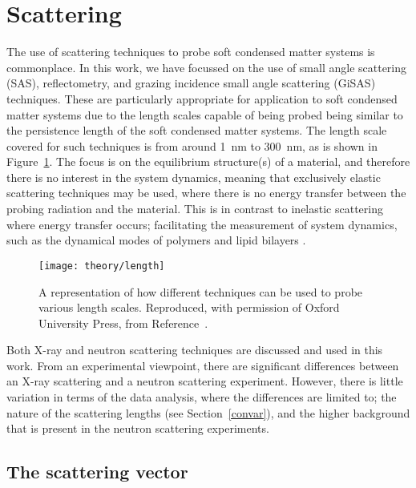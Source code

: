 \section{Scattering}
\label{sec:scattering}

The use of scattering techniques to probe soft condensed matter systems is commonplace.
In this work, we have focussed on the use of small angle scattering (SAS), reflectometry, and grazing incidence small angle scattering (GiSAS) techniques.
These are particularly appropriate for application to soft condensed matter systems due to the length scales capable of being probed being similar to the persistence length of the soft condensed matter systems.
The length scale covered for such techniques is from around \SI{1}{\nano\metre} to \SI{300}{\nano\metre}, as is shown in Figure~\ref{fig:lengths}.
The focus is on the equilibrium structure(s) of a material, and therefore there is no interest in the system dynamics, meaning that exclusively elastic scattering techniques may be used, where there is no energy transfer between the probing radiation and the material.
This is in contrast to inelastic scattering where energy transfer occurs; facilitating the measurement of system dynamics, such as the dynamical modes of polymers and lipid bilayers \cite{garcia_sakai_quasielastic_2009, farago_recent_2009}.
%
\begin{figure}
    \centering
    \texttt{[image: theory/length]}
    \caption{A representation of how different techniques can be used to probe various length scales. Reproduced, with permission of Oxford University Press\textsuperscript{\textcopyright}, from Reference~\cite{sivia_elementary_2011}.}
    \label{fig:lengths}
\end{figure}
%

Both X-ray and neutron scattering techniques are discussed and used in this work.
From an experimental viewpoint, there are significant differences between an X-ray scattering and a neutron scattering experiment.
However, there is little variation in terms of the data analysis, where the differences are limited to; the nature of the scattering lengths (see Section~\ref{convar}), and the higher background that is present in the neutron scattering experiments.

\subsection{The scattering vector}

